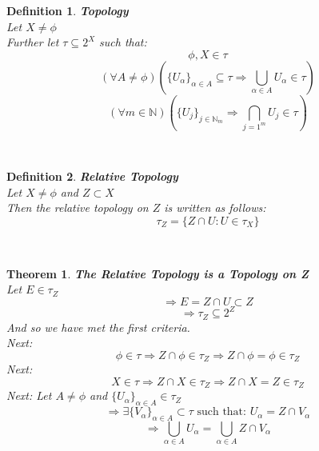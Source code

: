 \documentclass[12pt]{extarticle}
\theoremstyle{plain}
\newtheorem{thm}{Theorem}[section]
\theoremstyle{plain}
\theoremstyle{plain}
\theoremstyle{Definition}
\newtheorem{def.}{Definition}[section]
\theoremstyle{Definition}
\theoremstyle{plain}
\newcommand{\cut}[0]{\noindent\framebox[\linewidth]{\rule{\linewidth}{2pt}}\\}
\begin{document}
\begin{def.} \textbf{Topology} \\
	Let $X \not = \phi$ \\ 
	Further let $\tau \subseteq 2^X$ such that: \\ 
	$$\phi,X \in \tau$$
	$$(\forall A \not = \phi)\left(\{U_\alpha\}_{\alpha \in A} \subseteq \tau \Rightarrow \bigcup_{\alpha \in A} U_\alpha \in \tau\right)$$
	$$(\forall m \in \mathbb{N})\left(\{U_j\}_{j\in \mathbb{N}_m} \Rightarrow \bigcap_{j=1^m} U_j \in \tau\right)$$
\end{def.}
\cut
\begin{def.} \textbf{Relative Topology} \\
	Let $X \not = \phi$ and $Z \subset X$ \\ 
	Then the relative topology on $Z$ is written as follows: \\ 
	$$\tau_Z = \{Z \cap U : U \in \tau_X\}$$
\end{def.}
\cut
\begin{thm} \textbf{The Relative Topology is a Topology on Z} \\
	Let $E \in \tau_Z$ \\
	$$\Rightarrow E = Z \cap U \subset Z$$
	$$\Rightarrow \tau_Z \subseteq 2^Z$$
	And so we have met the first criteria. \\ 
	Next: 
	$$\phi \in \tau \Rightarrow Z \cap \phi \in \tau_Z \Rightarrow Z \cap \phi = \phi \in \tau_Z$$
	Next: 
	$$X \in \tau \Rightarrow Z \cap X \in \tau_Z \Rightarrow Z \cap X = Z \in \tau_Z$$
	Next: 
	Let $A \not = \phi$ and $\{U_\alpha\}_{\alpha \in A} \in \tau_Z$ \\ 
	$$\Rightarrow \exists \{V_\alpha\}_{\alpha \in A} \subset \tau \text{ such that: } U_\alpha = Z \cap V_\alpha$$
	$$\Rightarrow \bigcup_{\alpha \in A} U_\alpha = \bigcup_{\alpha \in A} Z \cap V_\alpha$$
\end{thm}
\cut
\end{document}
